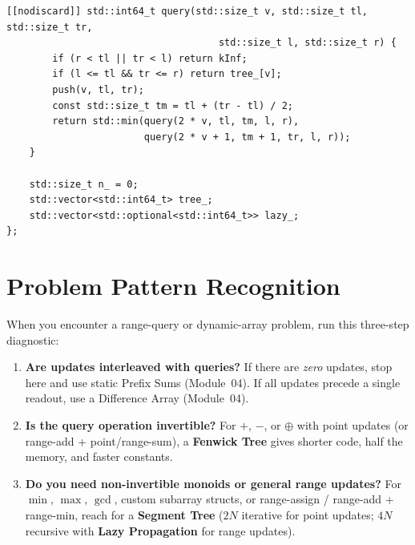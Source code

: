 \documentclass[11pt,a4paper]{article}
\theoremstyle{definition}
\begin{document}
\begin{lstlisting}[caption={Sentinel-safe Lazy Segment Tree for range assignment (including $0$) and range minimum.}]
    [[nodiscard]] std::int64_t query(std::size_t v, std::size_t tl, std::size_t tr,
                                     std::size_t l, std::size_t r) {
        if (r < tl || tr < l) return kInf;
        if (l <= tl && tr <= r) return tree_[v];
        push(v, tl, tr);
        const std::size_t tm = tl + (tr - tl) / 2;
        return std::min(query(2 * v, tl, tm, l, r),
                        query(2 * v + 1, tm + 1, tr, l, r));
    }

    std::size_t n_ = 0;
    std::vector<std::int64_t> tree_;
    std::vector<std::optional<std::int64_t>> lazy_;
};
\end{lstlisting}

\section{Problem Pattern Recognition}

When you encounter a range-query or dynamic-array problem, run this three-step diagnostic:
\begin{enumerate}[itemsep=2pt, topsep=2pt]
    \item \textbf{Are updates interleaved with queries?} If there are \emph{zero} updates, stop here and use static Prefix Sums (Module~04). If all updates precede a single readout, use a Difference Array (Module~04).
    \item \textbf{Is the query operation invertible?} For $+$, $-$, or $\oplus$ with point updates (or range-add + point/range-sum), a \textbf{Fenwick Tree} gives shorter code, half the memory, and faster constants.
    \item \textbf{Do you need non-invertible monoids or general range updates?} For $\min$, $\max$, $\gcd$, custom subarray structs, or range-assign / range-add + range-min, reach for a \textbf{Segment Tree} ($2N$ iterative for point updates; $4N$ recursive with \textbf{Lazy Propagation} for range updates).
\end{enumerate}
\end{document}
